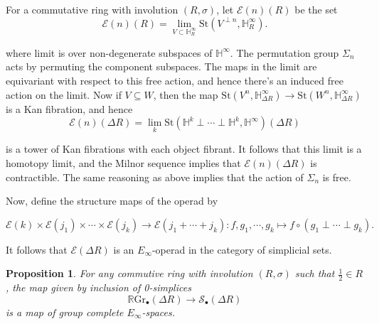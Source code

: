 \documentclass[draftthesis,tocnosub,noragright,centerchapter,10pt]{uiucthesis2009}
\newcommand{\mbb}{\mathbb}
\newcommand{\mc}{\mathcal}
\newcommand{\RGr}{\mathbb R\mathrm{Gr}}
\newcommand{\St}{\mathrm{St}}
\theoremstyle{plain}
\newtheorem{proposition}[lemma]{Proposition}
\theoremstyle{definition}
\begin{document}
For a commutative ring with involution $(R,\sigma)$, let $\mathscr
E(n)(R)$ be the set
\[
\mathscr E(n)(R) = \lim_{V \subset \mbb H^\infty_R} \St(V^{\perp n} , \mbb H^\infty_R).
\]

where limit is over non-degenerate subspaces of $\mbb H^\infty$. The
permutation group $\Sigma_n$ acts by permuting the component
subspaces. The maps in the limit are equivariant with respect to this
free action, and hence there's an induced free action on the
limit. Now if $V \subseteq W$, then the map $\St(V^n,\mbb
H^\infty_{\Delta R}) \rightarrow \St(W^n,\mbb H^\infty_{\Delta R})$ is
a Kan fibration, and hence
\[
\mathscr E(n)(\Delta R) = \lim_k \St(\mbb H^k \perp \cdots \perp \mbb
H^k,\mbb H^\infty)(\Delta R)
\]

is a tower of Kan fibrations with each object fibrant. It follows that
this limit is a homotopy limit, and the Milnor sequence implies that
$\mathscr E(n)(\Delta R)$ is contractible. The same reasoning as above
implies that the action of $\Sigma_n$ is free. 

Now, define the structure maps of the operad by

\[
\mathscr E(k) \times \mathscr E(j_1) \times \cdots \times \mathscr
E(j_k) \rightarrow \mathscr E(j_1 + \cdots + j_k) : f,g_1,\cdots,g_k
\mapsto f \circ (g_1 \perp \cdots \perp g_k).
\]

It follows that $\mathscr E(\Delta R)$ is an $E_\infty$-operad in the
category of simplicial sets.

\begin{proposition}
For any commutive ring with involution $(R,\sigma)$ such that
$\frac{1}{2} \in R$, the map given by inclusion of 0-simplices
\[
\RGr_\bullet(\Delta R) \rightarrow \mc S_\bullet(\Delta R)
\]
is a map of group complete $E_\infty$-spaces.
\end{proposition}
\end{document}
